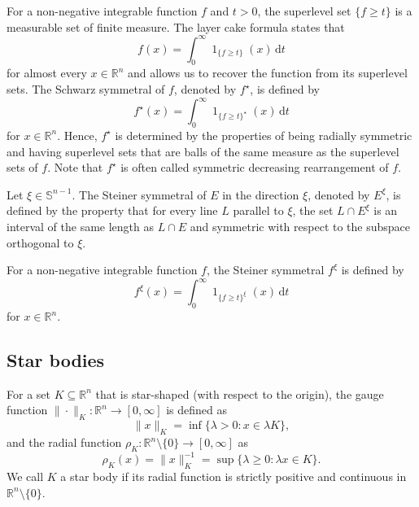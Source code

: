 \documentclass{amsart}
\newcommand{\snvtex}{{\mathbb S}^{n-1}}
\newcommand{\dvtex}{\,\mathrm{d}}
\renewcommand{\chi}{\operatorname{1}}
\begin{document}
For a non-negative integrable function $f$ and $t>0$, the superlevel set
$\{f \geq t\}$ is a measurable set of finite measure. The layer cake formula
states that
%
\begin{equation*}
f(x) = \int _{0}^{\infty }\chi _{\{f\geq t\}}(x) \dvtex t
\end{equation*}
%
for almost every $x \in \mathbb R^{n}$ and allows us to recover the function
from its superlevel sets. The Schwarz symmetral of $f$, denoted by
$f^{\star}$, is defined by
%
\begin{equation*}
f^{\star}(x) = \int _{0}^{\infty }\chi _{\{f\geq t\}^{\star}}(x) \dvtex t
\end{equation*}
%
for $x\in \mathbb R^{n}$. Hence, $f^{\star}$ is determined by the properties
of being radially symmetric and having superlevel sets that are balls of
the same measure as the superlevel sets of $f$. Note that
$f^{\star}$ is often called symmetric decreasing rearrangement of
$f$.

Let $\xi \in \snvtex $. The Steiner symmetral of $E$ in the direction
$\xi $, denoted by $E^{\xi}$, is defined by the property that for every
line $L$ parallel to $\xi $, the set $L \cap E^{\xi}$ is an interval of
the same length as $L \cap E$ and symmetric with respect to the subspace
orthogonal to $\xi $.

For a non-negative integrable function $f$, the Steiner symmetral
$f^{\xi}$ is defined by
%
\begin{equation*}
f^{\xi}(x) = \int _{0}^{\infty }\chi _{\{f\geq t\}^{\xi}}(x) \dvtex t
\end{equation*}
%
for $x\in \mathbb R^{n}$.

\subsection{Star bodies}

For a set $K \subseteq \mathbb R^{n}$ that is star-shaped (with respect
to the origin), the gauge function
$\|\cdot \|_{K} : \mathbb R^{n} \to [0,\infty ]$ is defined as
%
\begin{equation*}
\|x\|_{K} = \inf \{ \lambda > 0 : x \in \lambda K\},
\end{equation*}
%
and the radial function
$\rho _{K}:\mathbb R^{n} \setminus \{0\} \to [0,\infty ]$ as
%
\begin{equation*}
\rho _{K}(x) = \|x\|_{K}^{-1} = \sup \{\lambda \geq 0:\lambda x \in K
\}.
\end{equation*}
%
We call $K$ a star body if its radial function is strictly positive and
continuous in $\mathbb R^{n} \setminus \{0\}$.
\end{document}

